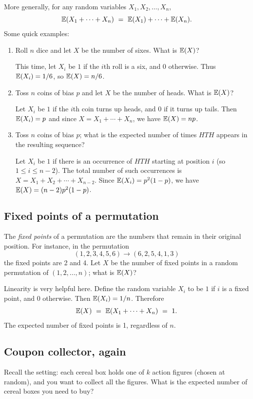 More generally, for any random variables $X_1, X_2, \ldots, X_n$,
$$ \mathbb{E}(X_1 + \cdots + X_n) \ = \ \mathbb{E}(X_1) + \cdots + \mathbb{E}(X_n) .$$
Some quick examples:
\begin{enumerate}
\item Roll $n$ dice and let $X$ be the number of sixes. What is $\mathbb{E}(X)$?

This time, let $X_i$ be $1$ if the $i$th roll is a six, and $0$ otherwise. Thus 
$\mathbb{E}(X_i) = 1/6$, so $\mathbb{E}(X) = n/6$.

\item Toss $n$ coins of bias $p$ and let $X$ be the number of heads. What is $\mathbb{E}(X)$?

Let $X_i$ be $1$ if the $i$th coin turns up heads, and $0$ if it turns up tails. Then
$\mathbb{E}(X_i) = p$ and since $X = X_1 + \cdots + X_n$, we have $\mathbb{E}(X) = np$.

\item Toss $n$ coins of bias $p$; what is the expected number of times $HTH$ appears 
in the resulting sequence?

Let $X_i$ be $1$ if there is an occurrence of $HTH$ starting at position $i$ (so
$1 \leq i \leq n-2$). The total number of such occurrences is
$X = X_1 + X_2 + \cdots + X_{n-2}$. Since $\mathbb{E}(X_i) = p^2(1-p)$, we have 
$\mathbb{E}(X) = (n-2) p^2(1-p)$.
\end{enumerate}

\subsection{Fixed points of a permutation}

The {\it fixed points} of a permutation are the numbers that remain in their original 
position. For instance, in the permutation
$$ (1,2,3,4,5,6) \rightarrow (6,2,5,4,1,3)$$
the fixed points are 2 and 4. Let $X$ be the number of fixed points in a random 
permutation of $(1,2,\ldots, n)$; what is $\mathbb{E}(X)$?

Linearity is very helpful here. Define the random variable $X_i$ to be $1$ if $i$
is a fixed point, and $0$ otherwise. Then $\mathbb{E}(X_i) = 1/n$. Therefore
$$ \E(X) 
\ = \ 
\E(X_1 + \cdots + X_n)
\ = \ 
1.
$$
The expected number of fixed points is 1, regardless of $n$.

\subsection{Coupon collector, again}

Recall the setting: each cereal box holds one of $k$ action figures (chosen at random), and
you want to collect all the figures. What is the expected number of cereal boxes you need
to buy?

